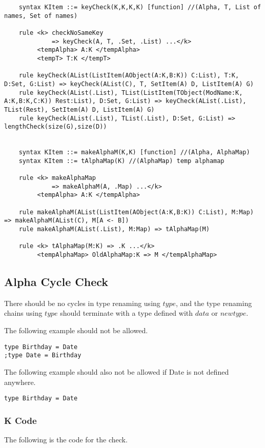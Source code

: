 \begin{lstlisting}
    syntax KItem ::= keyCheck(K,K,K,K) [function] //(Alpha, T, List of names, Set of names)

    rule <k> checkNoSameKey
             => keyCheck(A, T, .Set, .List) ...</k>
         <tempAlpha> A:K </tempAlpha>
         <tempT> T:K </tempT>

    rule keyCheck(AList(ListItem(AObject(A:K,B:K)) C:List), T:K, D:Set, G:List) => keyCheck(AList(C), T, SetItem(A) D, ListItem(A) G)
    rule keyCheck(AList(.List), TList(ListItem(TObject(ModName:K, A:K,B:K,C:K)) Rest:List), D:Set, G:List) => keyCheck(AList(.List), TList(Rest), SetItem(A) D, ListItem(A) G)
    rule keyCheck(AList(.List), TList(.List), D:Set, G:List) => lengthCheck(size(G),size(D))


    syntax KItem ::= makeAlphaM(K,K) [function] //(Alpha, AlphaMap)
    syntax KItem ::= tAlphaMap(K) //(AlphaMap) temp alphamap

    rule <k> makeAlphaMap
             => makeAlphaM(A, .Map) ...</k>
         <tempAlpha> A:K </tempAlpha>

    rule makeAlphaM(AList(ListItem(AObject(A:K,B:K)) C:List), M:Map) => makeAlphaM(AList(C), M[A <- B])
    rule makeAlphaM(AList(.List), M:Map) => tAlphaMap(M)

    rule <k> tAlphaMap(M:K) => .K ...</k>
         <tempAlphaMap> OldAlphaMap:K => M </tempAlphaMap>
\end{lstlisting}

\subsection{Alpha Cycle Check}
There should be no cycles in type renaming using $type$, and the type renaming chains using $type$ should terminate with a type defined with $data$ or $newtype$.

The following example should not be allowed.
\begin{lstlisting}
type Birthday = Date
;type Date = Birthday
\end{lstlisting}

The following example should also not be allowed if Date is not defined anywhere.
\begin{lstlisting}
type Birthday = Date
\end{lstlisting}

\subsubsection{K Code}
The following is the code for the check.

